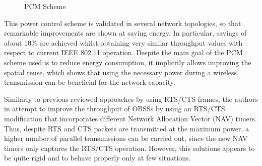 \documentclass[12pt, a4paper,twoside]{tesi_upf}
\begin{document}
				\begin{figure}[h!]
					\centering
					\caption{PCM Scheme}
					\label{fig:pcm}
				\end{figure}
				This power control scheme is validated in several network topologies, so that remarkable improvements are shown at saving energy. In particular, savings of about 10\% are achieved whilst obtaining very similar throughput values with respect to current IEEE 802.11 operation. Despite the main goal of the PCM scheme used is to reduce energy consumption, it implicitly allows improving the spatial reuse, which shows that using the necessary power during a wireless transmission can be beneficial for the network capacity. 
				
				Similarly to previous reviewed approaches by using RTS/CTS frames, the authors in \cite{lei2015performance} attempt to improve the throughput of OBSSs by using an RTS/CTS modification that incorporates different Network Allocation Vector (NAV) timers. Thus, despite RTS and CTS packets are transmitted at the maximum power, a higher number of parallel transmissions can be carried out, since the new NAV timers only captures the RTS/CTS operation. However, this solutions appears to be quite rigid and to behave properly only at few situations.
				
\end{document}

